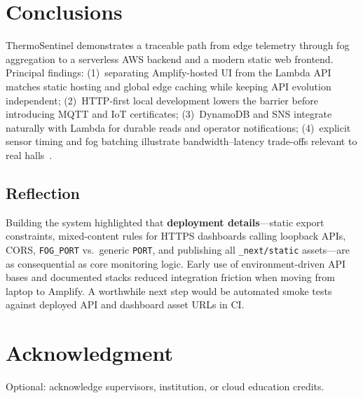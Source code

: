 \documentclass[conference]{IEEEtran}
\begin{document}
\section{Conclusions}

ThermoSentinel demonstrates a traceable path from edge telemetry through fog aggregation to a serverless AWS backend and a modern static web frontend. Principal findings: (1)~separating Amplify-hosted UI from the Lambda API matches static hosting and global edge caching while keeping API evolution independent; (2)~HTTP-first local development lowers the barrier before introducing MQTT and IoT certificates; (3)~DynamoDB and SNS integrate naturally with Lambda for durable reads and operator notifications; (4)~explicit sensor timing and fog batching illustrate bandwidth--latency trade-offs relevant to real halls~\cite{yi2015survey}.

\subsection{Reflection}
Building the system highlighted that \textbf{deployment details}---static export constraints, mixed-content rules for HTTPS dashboards calling loopback APIs, CORS, \texttt{FOG\_PORT} vs.\ generic \texttt{PORT}, and publishing all \texttt{\_next/static} assets---are as consequential as core monitoring logic. Early use of environment-driven API bases and documented stacks reduced integration friction when moving from laptop to Amplify. A worthwhile next step would be automated smoke tests against deployed API and dashboard asset URLs in CI.

\section*{Acknowledgment}
Optional: acknowledge supervisors, institution, or cloud education credits.
\end{document}
